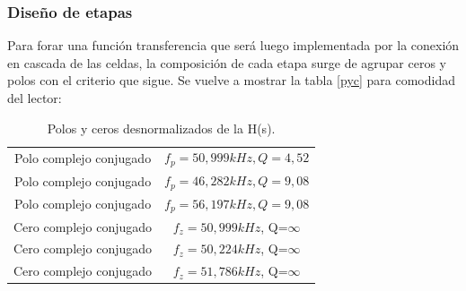 \subsubsection{Dise\~no de etapas}

Para forar una funci\'on transferencia que ser\'a luego implementada por la conexi\'on en cascada de las celdas, la composici\'on de cada etapa surge de agrupar ceros y polos con el criterio que sigue. Se vuelve a mostrar la tabla \ref{pyc} para comodidad del lector:

\begin{table}[H]
	\centering
	\begin{tabular}{c c}
		\hline
		Polo complejo conjugado& $f_p =50,999kHz, Q=4,52$ \\ 
		Polo complejo conjugado &  $f_p=46,282kHz, Q=9,08$\\
		Polo complejo conjugado & $f_p=56,197kHz, Q=9,08$\\
		Cero complejo conjugado & $f_z= 50,999kHz$, Q=$\infty$\\
		Cero complejo conjugado & $f_z= 50,224kHz$, Q=$\infty$\\
		Cero complejo conjugado & $f_z= 51,786kHz$, Q=$\infty$\\
		\hline
	\end{tabular}
	\caption{Polos y ceros desnormalizados de la H(s).}
	\label{pyc2}
\end{table}


